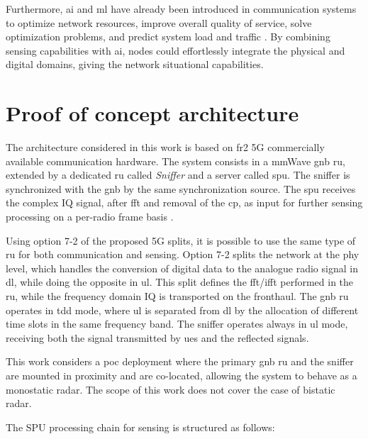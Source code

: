 	 Furthermore, \gls{ai} and \gls{ml} have already been introduced in communication systems to optimize network resources, improve overall quality of service, solve optimization problems, and predict system load and traffic \cite{30_years_ai_survey}. 
	 By combining sensing capabilities with \gls{ai}, nodes could effortlessly integrate the physical and digital domains, giving the network situational capabilities.
	


\section{Proof of concept architecture}
	\label{sec:intro-PoCarchitecture}
	
	The architecture considered in this work is based on \gls{fr2} 5G commercially available communication hardware.
	The system consists in a mmWave \gls{gnb} \gls{ru}, extended by a dedicated \gls{ru} called \textit{Sniffer} and a server called \gls{spu}. 
	The sniffer is synchronized with the \gls{gnb} by the same synchronization source. 
	The \gls{spu} receives the complex IQ signal,  after \gls{fft} and removal of the \gls{cp}, as input for further sensing processing on a per-radio frame basis \cite{Wild_Grudnitsky_Mandelli_Henninger_Guan_Schaich_2023}.
	
	Using option 7-2 of the proposed 5G splits, it is possible to use the same type of \gls{ru} for both communication and sensing.
	Option 7-2 splits the network at the \gls{phy} level, which handles the conversion of digital data to the analogue radio signal in \gls{dl}, while doing the opposite in \gls{ul}.
	This split defines the \gls{fft}/\gls{ifft} performed in the \gls{ru}, while the frequency domain IQ is transported on the fronthaul.
	The \gls{gnb} \gls{ru} operates in \gls{tdd} mode, where \gls{ul} is separated from \gls{dl} by the allocation of different time slots in the same frequency band. 	
	The sniffer operates always in \gls{ul} mode, receiving both the signal transmitted by \glspl{ue} and the reflected signals. 
	
	This work considers a \gls{poc} deployment where the primary \gls{gnb} \gls{ru} and the sniffer are mounted in proximity and are co-located, allowing the system to behave as a monostatic radar. 
	The scope of this work does not cover the case of bistatic radar.
	
	The SPU processing chain for sensing is structured as follows:
	
